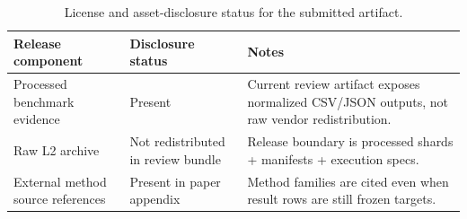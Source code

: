 \begin{table}[t]
\centering
\caption{License and asset-disclosure status for the submitted artifact.}
\label{tab:table_25_disclosure}
\begin{tabular}{lll}
\toprule
Release component & Disclosure status & Notes \\
\midrule
Processed benchmark evidence & Present & Current review artifact exposes normalized CSV/JSON outputs, not raw vendor redistribution. \\
Raw L2 archive & Not redistributed in review bundle & Release boundary is processed shards + manifests + execution specs. \\
External method source references & Present in paper appendix & Method families are cited even when result rows are still frozen targets. \\
\bottomrule
\end{tabular}
\end{table}
